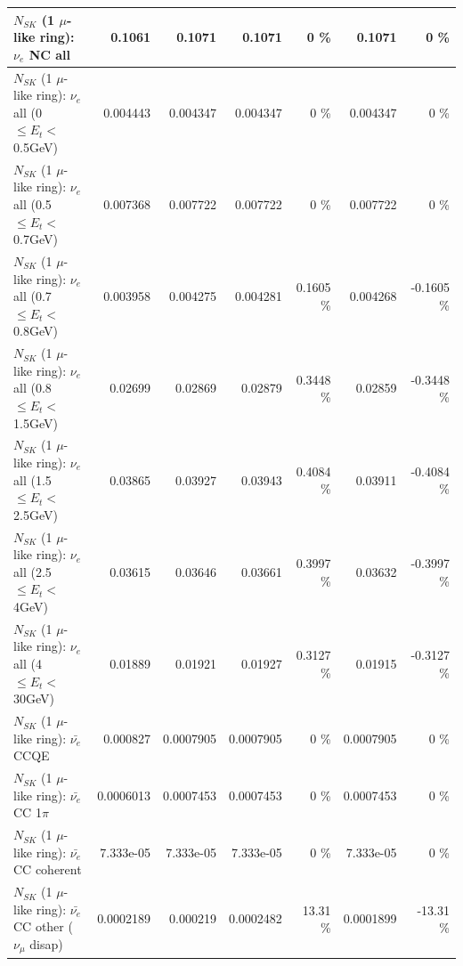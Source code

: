 \begin{table}
\begin{tabular}{| l | r | r | r  r | r  r |}
                                  $N_{SK}$ (1 $\mu$-like ring): $\nu_{e}$ NC all &          0.1061 &          0.1071 &          0.1071 &        0 \%  &          0.1071 &        0 \%  \\ 
\hline
           $N_{SK}$ (1 $\mu$-like ring): $\nu_{e}$ all (0 $\leq E_{t} <$ 0.5GeV) &        0.004443 &        0.004347 &        0.004347 &        0 \%  &        0.004347 &        0 \%  \\ 
         $N_{SK}$ (1 $\mu$-like ring): $\nu_{e}$ all (0.5 $\leq E_{t} <$ 0.7GeV) &        0.007368 &        0.007722 &        0.007722 &        0 \%  &        0.007722 &        0 \%  \\ 
         $N_{SK}$ (1 $\mu$-like ring): $\nu_{e}$ all (0.7 $\leq E_{t} <$ 0.8GeV) &        0.003958 &        0.004275 &        0.004281 &   0.1605 \%  &        0.004268 &  -0.1605 \%  \\ 
         $N_{SK}$ (1 $\mu$-like ring): $\nu_{e}$ all (0.8 $\leq E_{t} <$ 1.5GeV) &         0.02699 &         0.02869 &         0.02879 &   0.3448 \%  &         0.02859 &  -0.3448 \%  \\ 
         $N_{SK}$ (1 $\mu$-like ring): $\nu_{e}$ all (1.5 $\leq E_{t} <$ 2.5GeV) &         0.03865 &         0.03927 &         0.03943 &   0.4084 \%  &         0.03911 &  -0.4084 \%  \\ 
           $N_{SK}$ (1 $\mu$-like ring): $\nu_{e}$ all (2.5 $\leq E_{t} <$ 4GeV) &         0.03615 &         0.03646 &         0.03661 &   0.3997 \%  &         0.03632 &  -0.3997 \%  \\ 
            $N_{SK}$ (1 $\mu$-like ring): $\nu_{e}$ all (4 $\leq E_{t} <$ 30GeV) &         0.01889 &         0.01921 &         0.01927 &   0.3127 \%  &         0.01915 &  -0.3127 \%  \\ 
\hline
\hline
\hline
                                $N_{SK}$ (1 $\mu$-like ring): $\bar{\nu_e}$ CCQE &        0.000827 &       0.0007905 &       0.0007905 &        0 \%  &       0.0007905 &        0 \%  \\ 
                           $N_{SK}$ (1 $\mu$-like ring): $\bar{\nu_e}$ CC 1$\pi$ &       0.0006013 &       0.0007453 &       0.0007453 &        0 \%  &       0.0007453 &        0 \%  \\ 
                         $N_{SK}$ (1 $\mu$-like ring): $\bar{\nu_e}$ CC coherent &       7.333e-05 &       7.333e-05 &       7.333e-05 &        0 \%  &       7.333e-05 &        0 \%  \\ 
          $N_{SK}$ (1 $\mu$-like ring): $\bar{\nu_e}$ CC other ($\nu_\mu$ disap) &       0.0002189 &        0.000219 &       0.0002482 &    13.31 \%  &       0.0001899 &   -13.31 \%  \\ 

\end{tabular}
\end{table}
